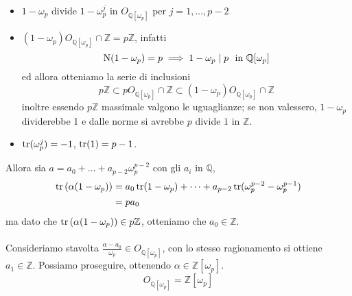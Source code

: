 \begin{esempio}
\begin{itemize}
		\item $1-\omega_p$ divide $1-\omega_p^j$ in $O_{\mathbb{Q}[\omega_p]}$ per $j=1,\dots,p-2$
		\item $(1-\omega_p)O_{\mathbb{Q}[\omega_p]}\cap\mathbb{Z}=p\mathbb{Z}$, infatti
		\begin{equation*}
		\N(1-\omega_p)=p\implies1-\omega_p\mid p \ \ \text{in $\mathbb{Q}[\omega_p]$}
		\end{equation*}
		ed allora otteniamo la serie di inclusioni 
		\begin{equation*}
		p\mathbb{Z}\subset pO_{\mathbb{Q}[\omega_p]}\cap\mathbb{Z}\subset(1-\omega_p)O_{\mathbb{Q}[\omega_p]}\cap\mathbb{Z}
		\end{equation*}
		inoltre essendo $p\mathbb{Z}$ massimale valgono le uguaglianze; se non valessero, $1-\omega_p$ dividerebbe 1 e dalle norme si avrebbe $p$ divide $1$ in $\mathbb{Z}$.
		\item $\operatorname{tr}(\omega_p^j)=-1$, $\operatorname{tr}(1)=p-1$.
	\end{itemize}
	Allora sia $a=a_0+\dots+a_{p-2}\omega_p^{p-2}$ con gli $a_i$ in $\mathbb{Q}$,
	\begin{align*}
	\operatorname{tr}\left(\alpha(1-\omega_p)\right)
	&=a_0\operatorname{tr}(1-\omega_p)+\dots+a_{p-2}\operatorname{tr}(\omega_p^{p-2}-\omega_p^{p-1})\\
	&=pa_0
	\end{align*}
	ma dato che $\operatorname{tr}\left(\alpha(1-\omega_p)\right)\in p\mathbb{Z}$, otteniamo che $a_0\in\mathbb{Z}$. \\ \\ Consideriamo stavolta $\frac{\alpha-a_0}{\omega_p}\in O_{\mathbb{Q}[\omega_p]}$, con lo stesso ragionamento si ottiene $a_1\in\mathbb{Z}$. Possiamo proseguire, %
	ottenendo $\alpha\in\mathbb{Z}[\omega_p]$.
	\begin{equation*}
	O_{\mathbb{Q}[\omega_p]}=\mathbb{Z}[\omega_p]
	\end{equation*}
\end{esempio}




